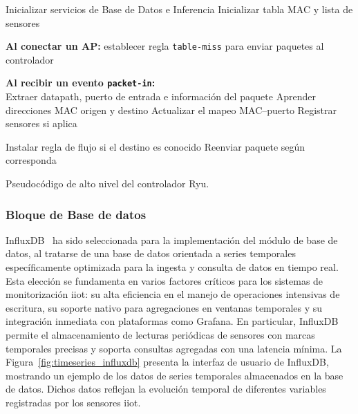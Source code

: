 \begin{algorithm}[ht!]
\DontPrintSemicolon
{}

Inicializar servicios de Base de Datos e Inferencia\;
Inicializar tabla MAC y lista de sensores\;

\textbf{Al conectar un AP:} establecer regla \texttt{table-miss} para enviar paquetes al controlador\;

\textbf{Al recibir un evento \texttt{packet-in}:} \\
\Indp
  Extraer datapath, puerto de entrada e información del paquete\;
  Aprender direcciones MAC origen y destino\;
  Actualizar el mapeo MAC–puerto\;
  Registrar sensores si aplica\;



  Instalar regla de flujo si el destino es conocido\;
  Reenviar paquete según corresponda\;
\Indm

\caption{Pseudocódigo de alto nivel del controlador Ryu.}
\label{alg:ryu}
\end{algorithm}


\subsubsection{Bloque de Base de datos}

InfluxDB~\cite{influxdb} ha sido seleccionada para la implementación del módulo de base de datos, al tratarse de una base de datos orientada a series temporales específicamente optimizada para la ingesta y consulta de datos en tiempo real. Esta elección se fundamenta en varios factores críticos para los sistemas de monitorización \gls{iiot}: su alta eficiencia en el manejo de operaciones intensivas de escritura, su soporte nativo para agregaciones en ventanas temporales y su integración inmediata con plataformas como Grafana. En particular, InfluxDB permite el almacenamiento de lecturas periódicas de sensores con marcas temporales precisas y soporta consultas agregadas con una latencia mínima. La Figura~\ref{fig:timeseries_influxdb} presenta la interfaz de usuario de InfluxDB, mostrando un ejemplo de los datos de series temporales almacenados en la base de datos. Dichos datos reflejan la evolución temporal de diferentes variables registradas por los sensores \gls{iiot}.

